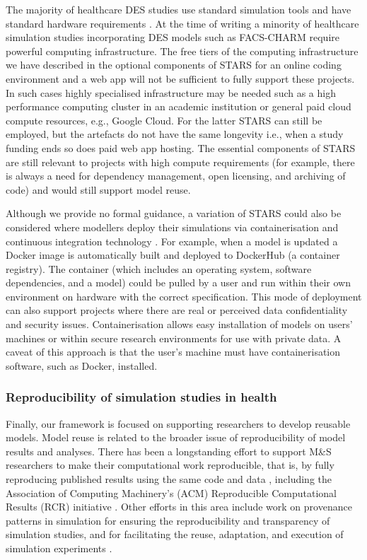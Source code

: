 \documentclass[]{interact}
\theoremstyle{plain}%
\theoremstyle{definition}
\theoremstyle{remark}
\begin{document}
The majority of healthcare DES studies use standard simulation tools and have standard hardware requirements \citep{monks2023computer}. At the time of writing a minority of healthcare simulation studies incorporating DES models such as FACS-CHARM \citep{Anagnostou_2022} require powerful computing infrastructure. The free tiers of the computing infrastructure we have described in the optional components of STARS for an online coding environment and a web app will not be sufficient to fully support these projects. In such cases highly specialised infrastructure may be needed such as a high performance computing cluster in an academic institution or general paid cloud compute resources, e.g., Google Cloud.  For the latter STARS can still be employed, but the artefacts do not have the same longevity i.e., when a study funding ends so does paid web app hosting. The essential components of STARS are still relevant to projects with high compute requirements (for example, there is always a need for dependency management, open licensing, and archiving of code) and would still support model reuse.  

Although we provide no formal guidance, a variation of STARS could also be considered where modellers deploy their simulations via containerisation and continuous integration technology \citep{harper_monks_manzi_2023, moreau2023containers}. For example, when a model is updated a Docker image is automatically built and deployed to DockerHub (a container registry). The container (which includes an operating system, software dependencies, and a model) could be pulled by a user and run within their own environment on hardware with the correct specification.  This mode of deployment can also support projects where there are real or perceived data confidentiality and security issues.  Containerisation allows easy installation of models on users' machines or within secure research environments for use with private data.  A caveat of this approach is that the user's machine must have containerisation software, such as Docker, installed.

\subsubsection{Reproducibility of simulation studies in health}

Finally, our framework is focused on supporting researchers to develop reusable models. Model reuse is related to the broader issue of reproducibility of model results and analyses. There has been a longstanding effort to support M\&S researchers to make their computational work reproducible, that is, by fully reproducing published results using the same code and data \citep{monks2019strengthening, taylor2018crisis, taylor2018session}, including the Association of Computing Machinery's (ACM) Reproducible Computational Results (RCR) initiative \citep{ACM_ArtifactReview}. Other efforts in this area include work on provenance patterns in simulation for ensuring the reproducibility and transparency of simulation studies, and for facilitating the reuse, adaptation, and execution of simulation experiments \citep{wilsdorf2022model, uhrmacher2023context}.
\end{document}
